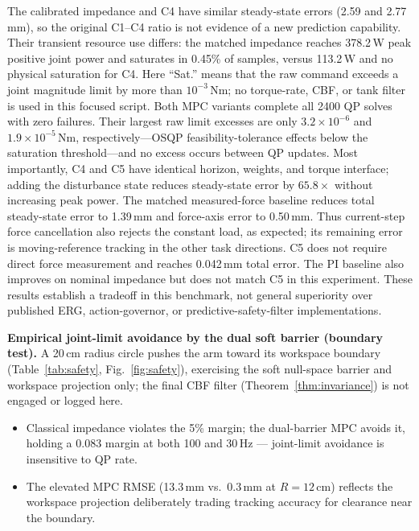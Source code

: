 \documentclass[journal]{IEEEtran}
\begin{document}
The calibrated impedance and C4 have similar steady-state errors
(2.59 and 2.77\,mm), so the original C1--C4 ratio is not evidence of a new
prediction capability. Their transient resource use differs: the matched
impedance reaches 378.2\,W peak positive joint power and saturates in 0.45\% of
samples, versus 113.2\,W and no physical saturation for C4. Here ``Sat.'' means
that the raw command exceeds a joint magnitude limit by more than
$10^{-3}$\,Nm; no torque-rate, CBF, or tank filter is used in this focused
script. Both MPC variants complete all 2400 QP solves with zero failures. Their
largest raw limit excesses are only $3.2\times10^{-6}$ and
$1.9\times10^{-5}$\,Nm, respectively---OSQP feasibility-tolerance effects
below the saturation threshold---and no excess occurs between QP updates.
Most importantly, C4 and C5 have
identical horizon, weights, and torque interface; adding the disturbance state
reduces steady-state error by $65.8\times$ without increasing peak power. The
matched measured-force baseline reduces total steady-state error to 1.39\,mm
and force-axis error to 0.50\,mm. Thus current-step force cancellation also
rejects the constant load, as expected; its remaining error is moving-reference
tracking in the other task directions. C5 does not require direct force
measurement and reaches 0.042\,mm total error. The PI baseline also improves on
nominal impedance but does not match C5 in this experiment. These results establish a tradeoff in
this benchmark, not general superiority over published ERG, action-governor,
or predictive-safety-filter implementations.

\textbf{Empirical joint-limit avoidance by the dual soft barrier
(boundary test).}
A 20\,cm radius circle pushes the arm toward its workspace boundary
(Table~\ref{tab:safety}, Fig.~\ref{fig:safety}), exercising the soft
null-space barrier and workspace projection only; the final CBF filter
(Theorem~\ref{thm:invariance}) is not engaged or logged here.

\begin{itemize}[leftmargin=*,itemsep=1pt,topsep=2pt]
\item Classical impedance violates the 5\% margin; the dual-barrier MPC
avoids it, holding a 0.083 margin at both 100 and 30\,Hz ---
joint-limit avoidance is insensitive to QP rate.
\item The elevated MPC RMSE (13.3\,mm vs.\ 0.3\,mm at $R=12$\,cm)
reflects the workspace projection deliberately trading tracking
accuracy for clearance near the boundary.
\end{itemize}
\end{document}
